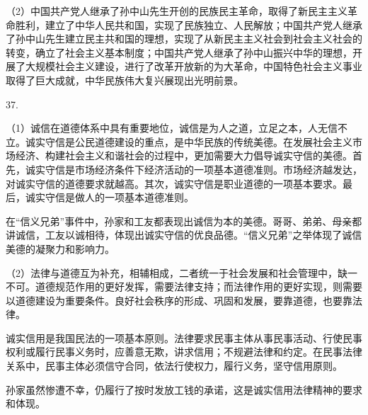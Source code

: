 \documentclass[a4paper]{article}
\begin{document}
（2）中国共产党人继承了孙中山先生开创的民族民主革命，取得了新民主主义革命胜利，建立了中华人民共和国，实现了民族独立、人民解放；中国共产党人继承了孙中山先生建立民主共和国的理想，实现了从新民主主义社会到社会主义社会的转变，确立了社会主义基本制度；中国共产党人继承了孙中山振兴中华的理想，开展了大规模社会主义建设，进行了改革开放新的为大革命，中国特色社会主义事业取得了巨大成就，中华民族伟大复兴展现出光明前景。

37.

（1）诚信在道德体系中具有重要地位，诚信是为人之道，立足之本，人无信不立。诚实守信是公民道德建设的重点，是中华民族的传统美德。在发展社会主义市场经济、构建社会主义和谐社会的过程中，更加需要大力倡导诚实守信的美德。首先，诚实守信是市场经济条件下经济活动的一项基本道德准则。市场经济越发达，对诚实守信的道德要求就越高。其次，诚实守信是职业道德的一项基本要求。最后，诚实守信是做人的一项基本道德准则。

在“信义兄弟”事件中，孙家和工友都表现出诚信为本的美德。哥哥、弟弟、母亲都讲诚信，工友以诚相待，体现出诚实守信的优良品德。“信义兄弟”之举体现了诚信美德的凝聚力和影响力。

（2）法律与道德互为补充，相辅相成，二者统一于社会发展和社会管理中，缺一不可。道德规范作用的更好发挥，需要法律支持；而法律作用的更好实现，则需要以道德建设为重要条件。良好社会秩序的形成、巩固和发展，要靠道德，也要靠法律。

诚实信用是我国民法的一项基本原则。法律要求民事主体从事民事活动、行使民事权利或履行民事义务时，应善意无欺，讲求信用；不规避法律和约定。在民事法律关系中，民事主体必须信守合同，依法行使权力，履行义务，坚守信用原则。

孙家虽然惨遭不幸，仍履行了按时发放工钱的承诺，这是诚实信用法律精神的要求和体现。
\end{document}

